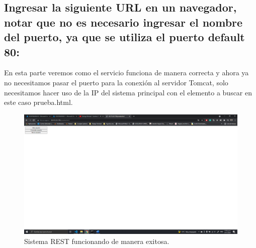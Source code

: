 \documentclass[11pt]{article}
\begin{document}
		\subsection{Ingresar la siguiente URL en un navegador, notar que no es necesario ingresar el nombre del puerto, ya que se utiliza el puerto default 80:}
		En esta parte veremos como el servicio funciona de manera correcta y ahora ya no necesitamos pasar el puerto para la conexión al servidor Tomcat, solo necesitamos hacer uso de la IP del sistema principal con el elemento a buscar en este caso prueba.html.
		\begin{figure}[H]
			\centering
			\includegraphics[scale=0.34]{resources/p9.png}
			\caption{Sistema REST funcionando de manera exitosa.}\label{fig:picture}
		\end{figure}
\end{document}
